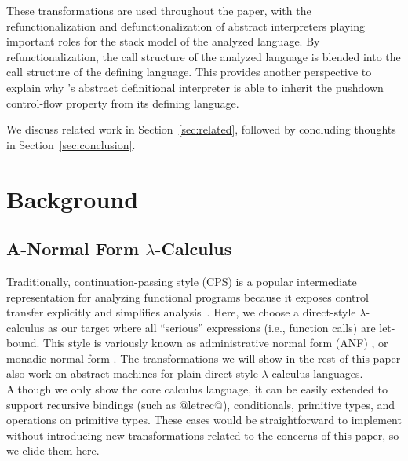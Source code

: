 \documentclass[acmsmall, screen]{acmart}\settopmatter{}
\begin{document}
These transformations are used throughout the paper, with the refunctionalization and
defunctionalization of abstract interpreters playing important roles for the stack model of
the analyzed language. By refunctionalization, the call structure of the analyzed language
is blended into the call structure of the defining language. This provides another perspective to
explain why \citeauthor{darais2017abstracting}'s abstract definitional interpreter
is able to inherit the pushdown control-flow property from its defining language.

We discuss related work in Section~\ref{sec:related}, followed by
concluding thoughts in Section~\ref{sec:conclusion}.

\iffalse
\subsection{Style}

We use Scala language to demonstrate the idea and each step of transformations.
We expect that readers have moderate familiarity to Scala's syntax, such as
case classes, pattern matching and for comprehension.

There are two main reasons we use a real-world language:
1) The code does not diminish the accuracy of the material than formal and mathematical
notations, which are heavily used in other static analysis or semantics papers.
The Scala code in this paper can be easily back-translated into formal notations.
2) As a functional pearl, the code in this paper is executable with only few changes,
which make it particularly fit for presenting syntactic transformations on abstract
interpreters.
\fi

\section{Background} \label{background}

\subsection{A-Normal Form $\lambda$-Calculus} \label{anfsyntax}

Traditionally, continuation-passing style (CPS) is a popular intermediate representation
for analyzing functional programs because it exposes control transfer explicitly and
simplifies analysis~\cite{Shivers:1991:SSC:115865.115884, Shivers:1988:CFA:53990.54007}.
Here, we choose a direct-style $\lambda$-calculus as our target where all ``serious''
expressions (i.e., function calls) are let-bound. This style is variously known as
administrative normal form (ANF) \cite{flanagan1993essence}, or monadic normal
form \cite{moggi1991notions,DBLP:conf/cc/Danvy03}. The transformations
we will show in the rest of this paper also work on abstract machines for plain
direct-style $\lambda$-calculus languages. Although we only show the core calculus language,
it can be easily extended to support recursive bindings (such as @letrec@), conditionals,
primitive types, and operations on primitive types. These cases would be straightforward to
implement without introducing new transformations related to the concerns of this paper,
so we elide them here.
\end{document}
